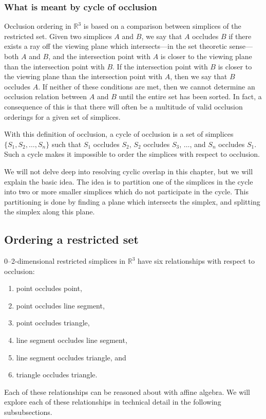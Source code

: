 \subsubsection{What is meant by cycle of occlusion}

Occlusion ordering in \(\mathbb{R}^{3}\) is based on a comparison 
between simplices of the restricted set. Given two simplices \(A\) and
\(B\), we say that \(A\) occludes \(B\) if there exists a ray off 
the viewing plane which intersects---in the set theoretic sense---both
\(A\) and \(B\), and the intersection point with \(A\) is closer to the
viewing plane than the intersection point with \(B\). If the
intersection point with \(B\) is closer to the viewing plane than
the intersection point with \(A\), then we say that \(B\) occludes
\(A\). If neither of these conditions are met, then we cannot determine 
an occlusion relation between \(A\) and \(B\) until the entire set has 
been sorted. In fact, a consequence of this is that there will often 
be a multitude of valid occlusion orderings for a given set of simplices.

With this definition of occlusion, a cycle of occlusion is a set of
simplices \(\{S_{1},S_{2},\ldots,S_{n}\}\) such that \(S_{1}\) occludes
\(S_{2}\), \(S_{2}\) occludes \(S_{3}\), \(\ldots\), and \(S_{n}\) occludes
\(S_{1}\). Such a cycle makes it impossible to order the simplices
with respect to occlusion. 

We will not delve deep into resolving cyclic overlap in this chapter, 
but we will explain the basic idea. The idea is to partition one of 
the simplices in the cycle into two or more smaller simplices which
do not participate in the cycle. This partitioning is done by
finding a plane which intersects the simplex, and splitting the
simplex along this plane. 

\subsection{Ordering a restricted set}

0--2-dimensional restricted simplices in \(\mathbb{R}^{3}\) 
have six relationships with respect to occlusion:
\begin{enumerate}
    \item point occludes point,
    \item point occludes line segment,
    \item point occludes triangle,
    \item line segment occludes line segment,
    \item line segment occludes triangle, and
    \item triangle occludes triangle.
\end{enumerate}
Each of these relationships can be reasoned about with affine algebra.
We will explore each of these relationships in technical detail in 
the following subsubsections.

